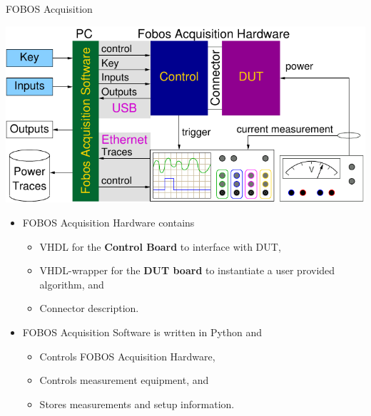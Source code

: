 \documentclass[xcolor=pdftex,dvipsnames,table,final]{beamer}
\begin{document}
\begin{frame}[fragile]{}
\begin{columns}[t]
\begin{column}{.31\linewidth}
      \begin{block}{FOBOS Acquisition}
        \begin{center}
          \includegraphics[scale=1.5]{../figures/fobos-dac}
        \end{center} 

          \begin{itemize}
            \item FOBOS Acquisition Hardware contains 
            \begin{itemize}
              \item VHDL for the \textbf{Control Board} to interface with DUT,
              \item VHDL-wrapper for the \textbf{DUT board} to instantiate a user provided algorithm, and
              \item Connector description.
            \end{itemize}
            \item FOBOS Acquisition Software is written in Python and 
            \begin{itemize}
              \item Controls FOBOS Acquisition Hardware,
              \item Controls measurement equipment, and
              \item Stores measurements and setup information.
            \end{itemize}
          \end{itemize}
       \end{block}
     

\end{column}
\end{columns}
\end{frame}
\end{document}
